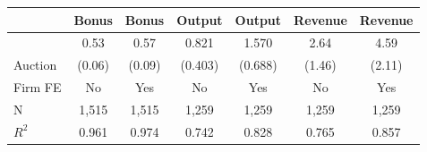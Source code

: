 
\begin{tabular}{lcccccc}
\toprule
 & Bonus & Bonus & Output & Output & Revenue & Revenue\\
\midrule
 & 0.53 & 0.57 & 0.821 & 1.570 & 2.64 & 4.59\\

\multirow{-2}{*}{\raggedright\arraybackslash Auction} & (0.06) & (0.09) & (0.403) & (0.688) & (1.46) & (2.11)\\

\midrule
Firm FE & No & Yes & No & Yes & No & Yes\\

N & 1,515 & 1,515 & 1,259 & 1,259 & 1,259 & 1,259\\

$R^2$ & 0.961 & 0.974 & 0.742 & 0.828 & 0.765 & 0.857\\
\bottomrule
\end{tabular}

